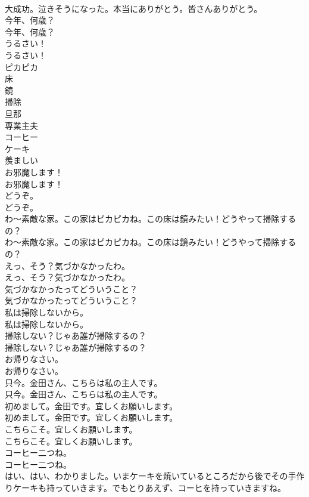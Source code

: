 \documentclass[8pt]{extreport}
\begin{document}
\begin{CJK}{UTF8}{min}
\\	大成功。泣きそうになった。本当にありがとう。皆さんありがとう。 
\\	今年、何歳？	
\\	今年、何歳？ 
\\	うるさい！	
\\	うるさい！ 
\\	ピカピカ
\\	床
\\	鏡
\\	掃除
\\	旦那
\\	専業主夫
\\	コーヒー
\\	ケーキ
\\	羨ましい
\\	お邪魔します！	
\\	お邪魔します！ 
\\	どうぞ。	
\\	どうぞ。 
\\	わ～素敵な家。この家はピカピカね。この床は鏡みたい！どうやって掃除するの？	
\\	わ～素敵な家。この家はピカピカね。この床は鏡みたい！どうやって掃除するの？ 
\\	えっ、そう？気づかなかったわ。	
\\	えっ、そう？気づかなかったわ。 
\\	気づかなかったってどういうこと？	
\\	気づかなかったってどういうこと？ 
\\	私は掃除しないから。	
\\	私は掃除しないから。 
\\	掃除しない？じゃあ誰が掃除するの？	
\\	掃除しない？じゃあ誰が掃除するの？ 
\\	お帰りなさい。	
\\	お帰りなさい。 
\\	只今。金田さん、こちらは私の主人です。	
\\	只今。金田さん、こちらは私の主人です。 
\\	初めまして。金田です。宜しくお願いします。	
\\	初めまして。金田です。宜しくお願いします。 
\\	こちらこそ。宜しくお願いします。	
\\	こちらこそ。宜しくお願いします。 
\\	コーヒー二つね。	
\\	コーヒー二つね。 
\\	はい、はい、わかりました。いまケーキを焼いているところだから後でその手作りケーキも持っていきます。でもとりあえず、コーヒを持っていきますね。	

\end{CJK}
\end{document}
